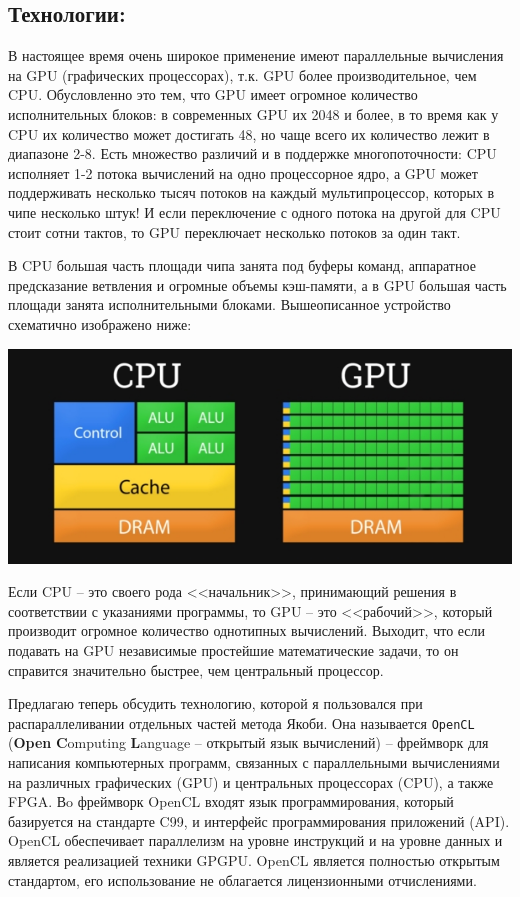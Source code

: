 \documentclass[utf8, 12pt, a4paper, oneside]{article}
\begin{document}
\subsection*{Технологии:}
В настоящее время очень широкое применение имеют параллельные вычисления на GPU (графических процессорах), т.к. GPU более производительное, чем CPU. Обусловленно это тем, что GPU имеет огромное количество исполнительных блоков: в современных GPU их 2048 и более, в то время как у CPU их количество может достигать 48, но чаще всего их количество лежит в диапазоне 2-8. Есть множество различий и в поддержке многопоточности: CPU исполняет 1-2 потока вычислений на одно процессорное ядро, а GPU может поддерживать несколько тысяч потоков на каждый мультипроцессор, которых в чипе несколько штук! И если переключение с одного потока на другой для CPU стоит сотни тактов, то GPU переключает несколько потоков за один такт.

В CPU большая часть площади чипа занята под буферы команд, аппаратное предсказание ветвления и огромные объемы кэш-памяти, а в GPU большая часть площади занята исполнительными блоками. Вышеописанное устройство схематично изображено ниже:
\begin{center}
\includegraphics[scale=0.5]{compare_paper}
\end{center}

Если CPU -- это своего рода <<начальник>>, принимающий решения в соответствии с указаниями программы, то GPU -- это <<рабочий>>, который производит огромное количество однотипных вычислений. Выходит, что если подавать на GPU независимые простейшие математические задачи, то он справится значительно быстрее, чем центральный процессор.

Предлагаю теперь обсудить технологию, которой я пользовался при распараллеливании отдельных частей метода Якоби. Она называется {\tt{OpenCL}} (\textbf{Open} \textbf{C}omputing \textbf{L}anguage -- открытый язык вычислений) -- фреймворк для написания компьютерных программ, связанных с параллельными вычислениями на различных графических (GPU) и центральных процессорах (CPU), а также FPGA. Вo фреймворк OpenCL входят язык программирования, который базируется на стандарте C99, и интерфейс программирования приложений (API). OpenCL обеспечивает параллелизм на уровне инструкций и на уровне данных и является реализацией техники GPGPU. OpenCL является полностью открытым стандартом, его использование не облагается лицензионными отчислениями.
\end{document}
